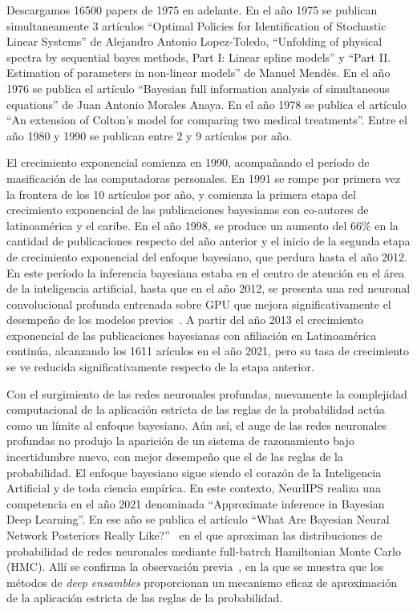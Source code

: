 \documentclass[a4paper,11pt]{book}
\theoremstyle{definition}
\begin{document}

Descargamos 16500 papers de 1975 en adelante.
%
En el a\~no 1975 se publican simultaneamente 3 art\'iculos ``Optimal Policies for Identification of Stochastic Linear Systems'' de Alejandro Antonio Lopez-Toledo, ``Unfolding of physical spectra by sequential bayes methods, Part I: Linear spline models'' y ``Part II. Estimation of parameters in non-linear models'' de Manuel Mendès.
%
En el a\~no 1976 se publica el art\'iculo ``Bayesian full information analysis of simultaneous equations'' de Juan Antonio Morales Anaya.
%
En el a\~no 1978 se publica el art\'iculo ``An extension of Colton's model for comparing two medical treatments''.
%
Entre el a\~no 1980 y 1990 se publican entre 2 y 9 art\'iculos por a\~no.


El crecimiento exponencial comienza en 1990, acompa\~nando el per\'iodo de masificaci\'on de las computadoras personales.
%
En 1991 se rompe por primera vez la frontera de los 10 art\'iculos por a\~no, y comienza la primera etapa del crecimiento exponencial de las publicaciones bayesianas con co-autores de latinoam\'erica y el caribe.
%
En el a\~no 1998, se produce un aumento del 66\% en la cantidad de publicaciones respecto del a\~no anterior y el inicio de la segunda etapa de crecimiento exponencial del enfoque bayesiano, que perdura hasta el a\~no 2012.
%
En este per\'iodo la inferencia bayesiana estaba en el centro de atenci\'on en el \'area de la inteligencia artificial, hasta que en el a\~no 2012, se presenta una red neuronal convolucional profunda entrenada sobre GPU que mejora significativamente el desempe\~no de los modelos previos~\cite{Krizhevsky2012}.
%
A partir del a\~no 2013 el crecimiento exponencial de las publicaciones bayesianas con afiliaci\'on en Latinoam\'erica contin\'ua, alcanzando los 1611 ar\'iculos en el a\~no 2021, pero su tasa de crecimiento se ve reducida significativamente respecto de la etapa anterior.


Con el surgimiento de las redes neuronales profundas, nuevamente la complejidad computacional de la aplicaci\'on estricta de las reglas de la probabilidad act\'ua como un l\'imite al enfoque bayesiano.
%
A\'un as\'i, el auge de las redes neuronales profundas no produjo la aparici\'on de un sistema de razonamiento bajo incertidumbre nuevo, con mejor desempe\~no que el de las reglas de la probabilidad.
%
El enfoque bayesiano sigue siendo el coraz\'on de la Inteligencia Artificial y de toda ciencia emp\'irica.
%
En este contexto, NeurlIPS realiza una competencia en el a\~no 2021 denominada ``Approximate inference in Bayesian Deep Learning''.
%
En ese a\~no se publica el art\'iculo ``What Are Bayesian Neural Network Posteriors Really Like?''~\cite{Izmailov2021} en el que aproximan las distribuciones de probabilidad de redes neuronales mediante full-batrch Hamiltonian Monte Carlo (HMC).
%
All\'i se confirma la observaci\'on previa~\cite{Wilson2020}, en la que se muestra que los m\'etodos de \emph{deep ensambles} proporcionan un mecanismo eficaz de aproximaci\'on de la aplicaci\'on estricta de las reglas de la probabilidad.
\end{document}
